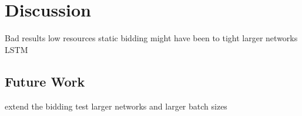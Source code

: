 \chapter{Discussion}
Bad results
low resources
static bidding might have been to tight
larger networks LSTM


\section{Future Work}
extend the bidding
test larger networks and larger batch sizes
